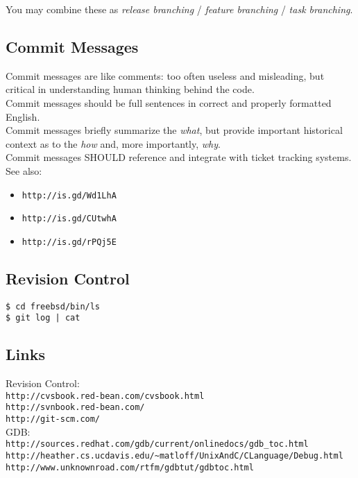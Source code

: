 \documentclass[xga]{xdvislides}
\begin{document}
You may combine these as {\em release branching} /
{\em feature branching} / {\em task branching}.

\subsection{Commit Messages}

Commit messages are like comments: too often useless
and misleading, but critical in understanding human
thinking behind the code. \\

Commit messages should be full sentences in correct
and properly formatted English. \\

Commit messages briefly summarize the {\em what}, but
provide important historical context as to the {\em
how} and, more importantly, {\em why}. \\

Commit messages SHOULD reference and integrate with
ticket tracking systems. \\

See also:
\begin{itemize}
	\item \verb+http://is.gd/Wd1LhA+
	\item \verb+http://is.gd/CUtwhA+
	\item \verb+http://is.gd/rPQj5E+
\end{itemize}

\subsection{Revision Control}
\begin{verbatim}
$ cd freebsd/bin/ls
$ git log | cat
\end{verbatim}

\subsection{Links}
Revision Control: \\
{\tt http://cvsbook.red-bean.com/cvsbook.html} \\

{\tt http://svnbook.red-bean.com/} \\

{\tt http://git-scm.com/} \\

GDB: \\
{\tt http://sources.redhat.com/gdb/current/onlinedocs/gdb\_toc.html} \\

\verb+http://heather.cs.ucdavis.edu/~matloff/UnixAndC/CLanguage/Debug.html+ \\

{\tt http://www.unknownroad.com/rtfm/gdbtut/gdbtoc.html}
\end{document}
